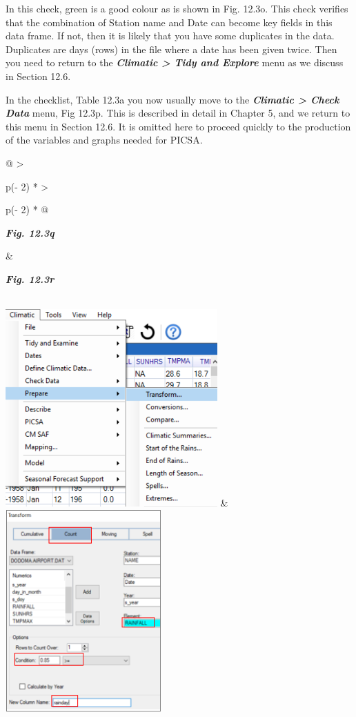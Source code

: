 \documentclass[
  letterpaper,
  DIV=11,
  numbers=noendperiod]{scrreprt}
\begin{document}
In this check, green is a good colour as is shown in Fig. 12.3o. This
check verifies that the combination of Station name and Date can become
key fields in this data frame. If not, then it is likely that you have
some duplicates in the data. Duplicates are days (rows) in the file
where a date has been given twice. Then you need to return to the
\textbf{\emph{Climatic \textgreater{} Tidy and Explore}} menu as we
discuss in Section 12.6.

In the checklist, Table 12.3a you now usually move to the
\textbf{\emph{Climatic \textgreater{} Check Data}} menu, Fig 12.3p. This
is described in detail in Chapter 5, and we return to this menu in
Section 12.6. It is omitted here to proceed quickly to the production of
the variables and graphs needed for PICSA.

\begin{longtable}[]{@{}
  >{\raggedright\arraybackslash}p{(\columnwidth - 2\tabcolsep) * }
  >{\raggedright\arraybackslash}p{(\columnwidth - 2\tabcolsep) * }@{}}
\toprule\noalign{}
\begin{minipage}[b]{\linewidth}\raggedright
\textbf{\emph{Fig. 12.3q}}
\end{minipage} & \begin{minipage}[b]{\linewidth}\raggedright
\textbf{\emph{Fig. 12.3r}}
\end{minipage} \\
\midrule\noalign{}
\endhead
\bottomrule\noalign{}
\endlastfoot
\includegraphics[width=3.19666in,height=2.97857in]{figures/Fig12.3q.png}
&
\includegraphics[width=2.34839in,height=3.04324in]{figures/Fig12.3r.png} \\
\end{longtable}
\end{document}
